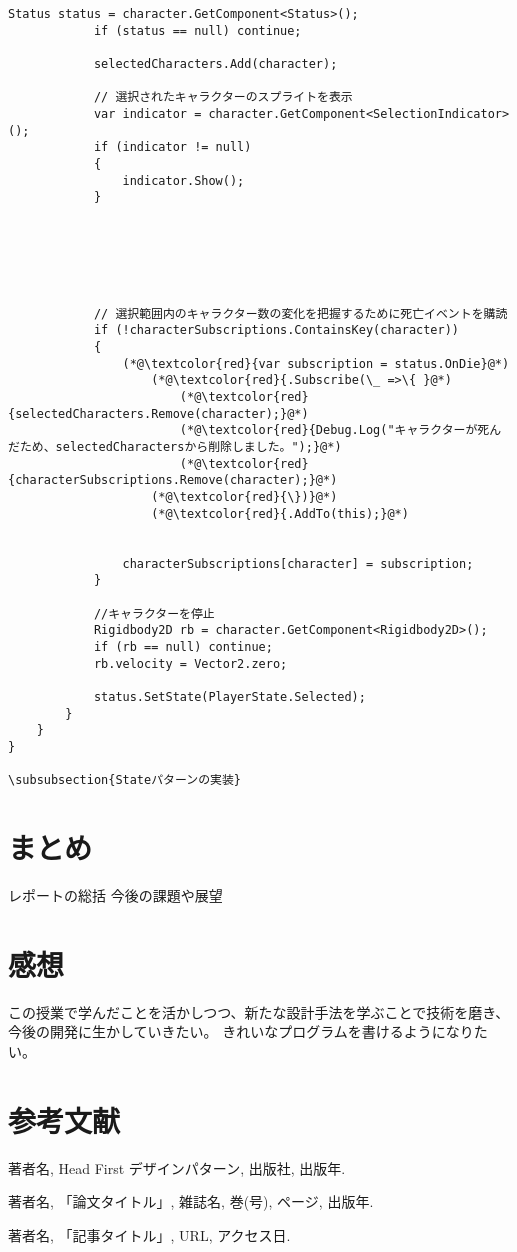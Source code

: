 \documentclass[dvipdfmx,fleqn,article]{jlreq}
\begin{document}
\begin{lstlisting}[language=CSharp, caption=Observerパターンの実装例]
            Status status = character.GetComponent<Status>();
            if (status == null) continue;

            selectedCharacters.Add(character);

            // 選択されたキャラクターのスプライトを表示
            var indicator = character.GetComponent<SelectionIndicator>();
            if (indicator != null)
            {
                indicator.Show();
            }






            // 選択範囲内のキャラクター数の変化を把握するために死亡イベントを購読
            if (!characterSubscriptions.ContainsKey(character))
            {
                (*@\textcolor{red}{var subscription = status.OnDie}@*)
                    (*@\textcolor{red}{.Subscribe(\_ =>\{ }@*)
                        (*@\textcolor{red}{selectedCharacters.Remove(character);}@*)
                        (*@\textcolor{red}{Debug.Log("キャラクターが死んだため、selectedCharactersから削除しました。");}@*)
                        (*@\textcolor{red}{characterSubscriptions.Remove(character);}@*)
                    (*@\textcolor{red}{\})}@*)
                    (*@\textcolor{red}{.AddTo(this);}@*)


                characterSubscriptions[character] = subscription;
            }

            //キャラクターを停止
            Rigidbody2D rb = character.GetComponent<Rigidbody2D>();
            if (rb == null) continue;
            rb.velocity = Vector2.zero;

            status.SetState(PlayerState.Selected);
        }
    }
}

\subsubsection{Stateパターンの実装}

\end{lstlisting}

\section{まとめ}
レポートの総括
今後の課題や展望

\section{感想}
この授業で学んだことを活かしつつ、新たな設計手法を学ぶことで技術を磨き、今後の開発に生かしていきたい。
きれいなプログラムを書けるようになりたい。

\section{参考文献}
\begin{thebibliography}{9}
    著者名, Head First デザインパターン, 出版社, 出版年.

    著者名, 「論文タイトル」, 雑誌名, 巻(号), ページ, 出版年.

    著者名, 「記事タイトル」, URL, アクセス日.
\end{thebibliography}
\end{document}
